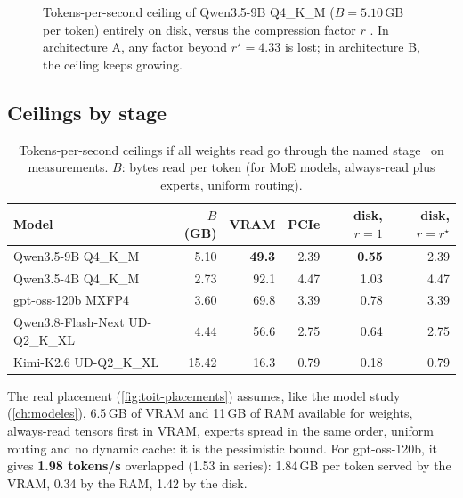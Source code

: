 \begin{figure}[ht]
\centering
\GrapheToitR
\caption[The roof of Qwen3.5-9B entirely on disk, versus $r$]{Tokens-per-second ceiling of Qwen3.5-9B Q4\_K\_M ($B = 5.10$\,GB per token) entirely on disk, versus the compression factor $r$ \calc. In architecture A, any factor beyond $r^\star = 4.33$ is lost; in architecture B, the ceiling keeps growing.}
\label{fig:toit-r}
\end{figure}

\subsection{Ceilings by stage}

\begin{table}[ht]
\centering\small
\caption[Tokens/s ceilings by stage]{Tokens-per-second ceilings if all weights read go through the named stage \calc~on measurements. $B$: bytes read per token (for MoE models, always-read plus experts, uniform routing).}
\label{tab:toit-modeles}
\begin{tabular}{@{}lrrrrr@{}}
\toprule
Model & $B$ (GB) & VRAM & PCIe & disk, $r=1$ & disk, $r=r^\star$ \\
\midrule
Qwen3.5-9B Q4\_K\_M & 5.10 & \textbf{49.3} & 2.39 & \textbf{0.55} & 2.39 \\
Qwen3.5-4B Q4\_K\_M & 2.73 & 92.1 & 4.47 & 1.03 & 4.47 \\
gpt-oss-120b MXFP4 & 3.60 & 69.8 & 3.39 & 0.78 & 3.39 \\
Qwen3.8-Flash-Next UD-Q2\_K\_XL & 4.44 & 56.6 & 2.75 & 0.64 & 2.75 \\
Kimi-K2.6 UD-Q2\_K\_XL & 15.42 & 16.3 & 0.79 & 0.18 & 0.79 \\
\bottomrule
\end{tabular}
\end{table}

The real placement (\cref{fig:toit-placements}) assumes, like the model study (\cref{ch:modeles}), 6.5\,GB of VRAM and 11\,GB of RAM available for weights, always-read tensors first in VRAM, experts spread in the same order, uniform routing and no dynamic cache: it is the pessimistic bound. For gpt-oss-120b, it gives \textbf{1.98 tokens/s} overlapped (1.53 in series): 1.84\,GB per token served by the VRAM, 0.34 by the RAM, 1.42 by the disk.


